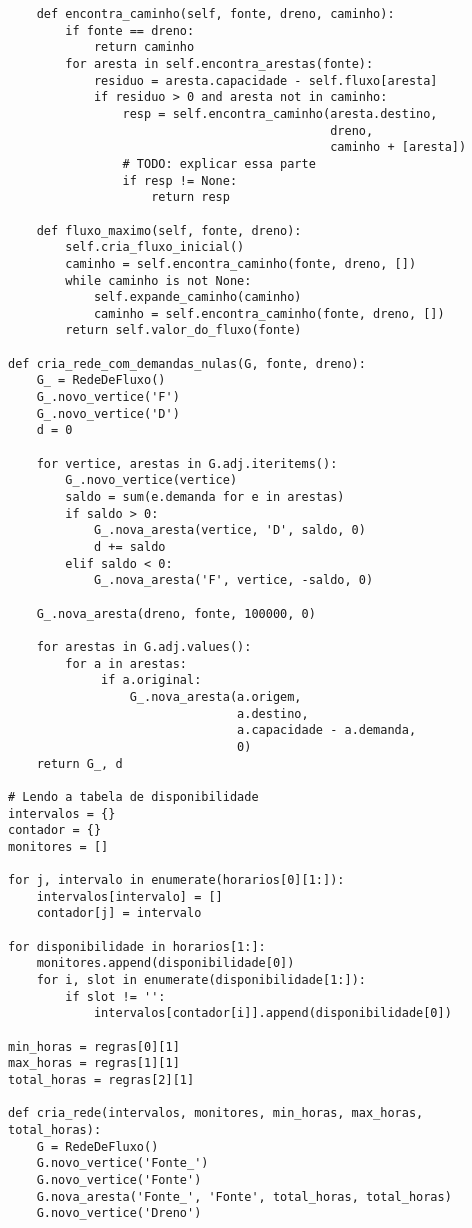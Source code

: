 \documentclass[11pt]{article}
\begin{document}
\begin{verbatim}
    def encontra_caminho(self, fonte, dreno, caminho):
        if fonte == dreno:
            return caminho
        for aresta in self.encontra_arestas(fonte):
            residuo = aresta.capacidade - self.fluxo[aresta]
            if residuo > 0 and aresta not in caminho:
                resp = self.encontra_caminho(aresta.destino,
                                             dreno,
                                             caminho + [aresta])
                # TODO: explicar essa parte
                if resp != None:
                    return resp

    def fluxo_maximo(self, fonte, dreno):
        self.cria_fluxo_inicial()
        caminho = self.encontra_caminho(fonte, dreno, [])
        while caminho is not None:
            self.expande_caminho(caminho)
            caminho = self.encontra_caminho(fonte, dreno, [])
        return self.valor_do_fluxo(fonte)

def cria_rede_com_demandas_nulas(G, fonte, dreno):
    G_ = RedeDeFluxo()
    G_.novo_vertice('F')
    G_.novo_vertice('D')
    d = 0

    for vertice, arestas in G.adj.iteritems():
        G_.novo_vertice(vertice)
        saldo = sum(e.demanda for e in arestas)
        if saldo > 0:
            G_.nova_aresta(vertice, 'D', saldo, 0)
            d += saldo
        elif saldo < 0:
            G_.nova_aresta('F', vertice, -saldo, 0)

    G_.nova_aresta(dreno, fonte, 100000, 0)

    for arestas in G.adj.values():
        for a in arestas:
             if a.original:
                 G_.nova_aresta(a.origem,
                                a.destino,
                                a.capacidade - a.demanda,
                                0)
    return G_, d

# Lendo a tabela de disponibilidade
intervalos = {}
contador = {}
monitores = []

for j, intervalo in enumerate(horarios[0][1:]):
    intervalos[intervalo] = []
    contador[j] = intervalo

for disponibilidade in horarios[1:]:
    monitores.append(disponibilidade[0])
    for i, slot in enumerate(disponibilidade[1:]):
        if slot != '':
            intervalos[contador[i]].append(disponibilidade[0])

min_horas = regras[0][1]
max_horas = regras[1][1]
total_horas = regras[2][1]

def cria_rede(intervalos, monitores, min_horas, max_horas, total_horas):
    G = RedeDeFluxo()
    G.novo_vertice('Fonte_')
    G.novo_vertice('Fonte')
    G.nova_aresta('Fonte_', 'Fonte', total_horas, total_horas)
    G.novo_vertice('Dreno')


\end{verbatim}
\end{document}
